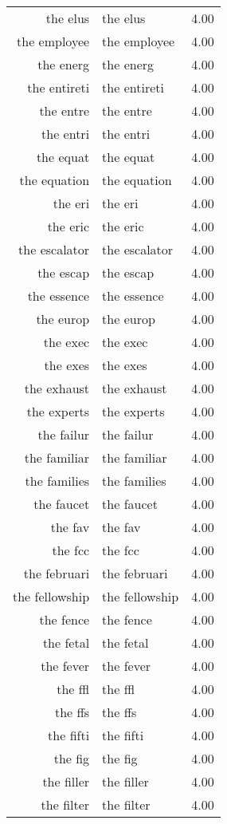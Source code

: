 \begin{table}[ht]
\begin{tabular}{rlr}
  the elus & the elus & 4.00 \\ 
  the employee & the employee & 4.00 \\ 
  the energ & the energ & 4.00 \\ 
  the entireti & the entireti & 4.00 \\ 
  the entre & the entre & 4.00 \\ 
  the entri & the entri & 4.00 \\ 
  the equat & the equat & 4.00 \\ 
  the equation & the equation & 4.00 \\ 
  the eri & the eri & 4.00 \\ 
  the eric & the eric & 4.00 \\ 
  the escalator & the escalator & 4.00 \\ 
  the escap & the escap & 4.00 \\ 
  the essence & the essence & 4.00 \\ 
  the europ & the europ & 4.00 \\ 
  the exec & the exec & 4.00 \\ 
  the exes & the exes & 4.00 \\ 
  the exhaust & the exhaust & 4.00 \\ 
  the experts & the experts & 4.00 \\ 
  the failur & the failur & 4.00 \\ 
  the familiar & the familiar & 4.00 \\ 
  the families & the families & 4.00 \\ 
  the faucet & the faucet & 4.00 \\ 
  the fav & the fav & 4.00 \\ 
  the fcc & the fcc & 4.00 \\ 
  the februari & the februari & 4.00 \\ 
  the fellowship & the fellowship & 4.00 \\ 
  the fence & the fence & 4.00 \\ 
  the fetal & the fetal & 4.00 \\ 
  the fever & the fever & 4.00 \\ 
  the ffl & the ffl & 4.00 \\ 
  the ffs & the ffs & 4.00 \\ 
  the fifti & the fifti & 4.00 \\ 
  the fig & the fig & 4.00 \\ 
  the filler & the filler & 4.00 \\ 
  the filter & the filter & 4.00 \\ 

\end{tabular}
\end{table}

